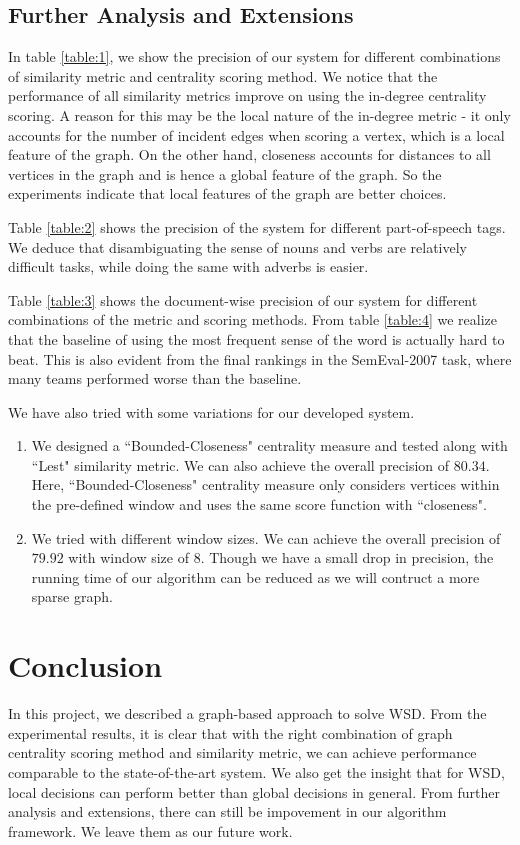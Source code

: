\documentclass[12pt,letterpaper]{article}
\begin{document}
\subsection{Further Analysis and Extensions}
In table \ref{table:1}, we show the precision of our system for different combinations of similarity metric and centrality scoring method. We notice that the performance of all similarity metrics improve on using the in-degree centrality scoring. A reason for this may be the local nature of the in-degree metric - it only accounts for the number of incident edges when scoring a vertex, which is a local feature of the graph. On the other hand, closeness accounts for distances to all vertices in the graph and is hence a global feature of the graph. So the experiments indicate that local features of the graph are better choices.   

Table \ref{table:2} shows the precision of the system for different part-of-speech tags. We deduce that disambiguating the sense of nouns and verbs are relatively difficult tasks, while doing the same with adverbs is easier. 

Table \ref{table:3} shows the document-wise precision of our system for different combinations of the metric and scoring methods.
From table \ref{table:4} we realize that the baseline of using the most frequent sense of the word is actually hard to beat. This is also evident from the final rankings in the SemEval-2007 task, where many teams performed worse than the baseline. 

We have also tried with some variations for our developed system. 
\begin{enumerate}
\item We designed a ``Bounded-Closeness" centrality measure and tested along with ``Lest" similarity metric. We can also achieve the overall precision of $80.34$. Here, ``Bounded-Closeness" centrality measure only considers vertices within the pre-defined window and uses the same score function with ``closeness".
\item We tried with different window sizes. We can achieve the overall precision of $79.92$ with window size of $8$. Though we have a small drop in precision, the running time of our algorithm can be reduced as we will contruct a more sparse graph.
\end{enumerate}

\section{Conclusion}
In this project, we described a graph-based approach to solve WSD. From the experimental results, it is clear that with the right combination of graph centrality scoring method and similarity metric, we can achieve performance comparable to the state-of-the-art system. We also get the insight that for WSD, local decisions can perform better than global decisions in general. From further analysis and extensions, there can still be impovement in our algorithm framework. We leave them as our future work.
\end{document}
